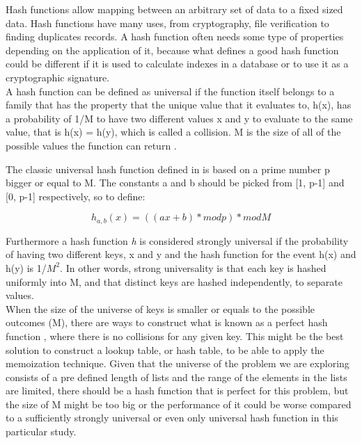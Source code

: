 \documentclass[a4paper,12pt]{article}
\begin{document}
Hash functions allow mapping between an arbitrary set of data to a fixed sized data. Hash functions have many uses, from cryptography, file verification to finding duplicates records. A hash function often needs some type of properties depending on the application of it, because what defines a good hash function could be different if it is used to calculate indexes in a database or to use it as a cryptographic signature. \\

A hash function can be defined as universal if the function itself belongs to a family that has the property that the unique value that it evaluates to, h(x), has a probability of 1/M to have two different values x and y to evaluate to the same value, that is h(x) = h(y), which is called a collision. M is the size of all of the possible values the function can return \cite{carter1979universal}.

The classic universal hash function defined in \cite{carter1979universal} is based on a prime number p bigger or equal to M. The constants a and b should be picked from  [1, p-1] and  [0, p-1] respectively, so to define:

\begin{equation}
    h_{a, b}(x) = ((ax + b)  * mod p) * mod M 
\end{equation}


Furthermore a hash function {\it h} is considered strongly universal if the probability of having two different keys, x and y and the hash function for the event h(x) and h(y) is 1/$M^{2}$. In other words, strong universality is that each key is hashed uniformly into M, and that distinct keys are hashed independently, to separate values.\\

When the size of the universe of keys is smaller or equals to the possible outcomes (M), there are ways to construct what is known as a perfect hash function  \cite{sprugnoli1977perfect}, where there is no collisions for any given key.  This might be the best solution to construct a lookup table, or hash table, to be able to apply the memoization technique. Given that the universe of the problem we are exploring consists of a pre defined length of lists and the range of the elements in the lists are limited, there should be a hash function that is perfect for this problem, but the size of M might be too big or the performance of it  could be worse compared to a sufficiently strongly universal or even only universal hash function in this particular study.
\end{document}
